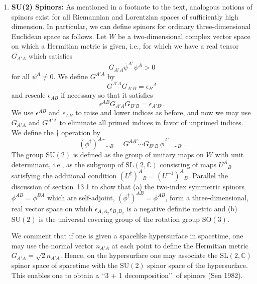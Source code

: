 
\chapterproblems

\begin{enumerate}[label=\arabic*.,leftmargin=2em,itemsep=1.2ex]
\item \textbf{SU(2) Spinors:} As mentioned in a footnote to the text, analogous
notions of spinors exist for all Riemannian and Lorentzian spaces of sufficiently
high dimension. In particular, we can define spinors for ordinary three-dimensional
Euclidean space as follows. Let \(W\) be a two-dimensional complex vector space on
which a Hermitian metric is given, i.e., for which we have a real tensor
\(G_{A'A}\) which satisfies
\[
  G_{A'A}\overline\psi^{A'}\psi^A>0
\]
for all \(\psi^A\ne0\). We define \(G^{A'A}\) by
\[
  G^{A'A}G_{A'B}=\epsilon_B{}^A
\]
and rescale \(\epsilon_{AB}\) if necessary so that it satisfies
\[
  \epsilon^{AB}G_{A'A}G_{B'B}=\overline\epsilon_{A'B'}.
\]
We use \(\epsilon^{AB}\) and \(\epsilon_{AB}\) to raise and lower indices as before,
and now we may use \(G_{A'A}\) and \(G^{A'A}\) to eliminate all primed indices in
favor of unprimed indices. We define the \(\dagger\) operation by
\[
  (\phi^\dagger)^{A\cdots}{}_{\cdots B}
  =G^{AA'}\cdots G_{B'}{}_{B}\,
    \overline\phi^{A'\cdots}{}_{\cdots B'}.
\]
The group \(\mathrm{SU}(2)\) is defined as the group of unitary maps on \(W\) with
unit determinant, i.e., as the subgroup of \(\mathrm{SL}(2,\mathbb C)\) consisting
of maps \(U^A{}_B\) satisfying the additional condition
\((U^\dagger)^A{}_B=(U^{-1})^A{}_B\). Parallel the discussion of section~13.1 to
show that (a) the two-index symmetric spinors
\(\phi^{AB}=\phi^{BA}\) which are self-adjoint,
\((\phi^\dagger)^{AB}=\phi^{AB}\), form a three-dimensional, real vector space on
which \(\epsilon_{A_1A_2}\epsilon_{B_1B_2}\) is a negative definite metric and
(b) \(\mathrm{SU}(2)\) is the universal covering group of the rotation group
\(\mathrm{SO}(3)\).

We comment that if one is given a spacelike hypersurface in spacetime, one may use
the normal vector \(n_{A'A}\) at each point to define the Hermitian metric
\(G_{A'A}=\sqrt2n_{A'A}\). Hence, on the hypersurface one may associate the
\(\mathrm{SL}(2,\mathbb C)\) spinor space of spacetime with the \(\mathrm{SU}(2)\)
spinor space of the hypersurface. This enables one to obtain a
\lq\lq 3 + 1 decomposition\rq\rq\ of spinors (Sen 1982).


\end{enumerate}
